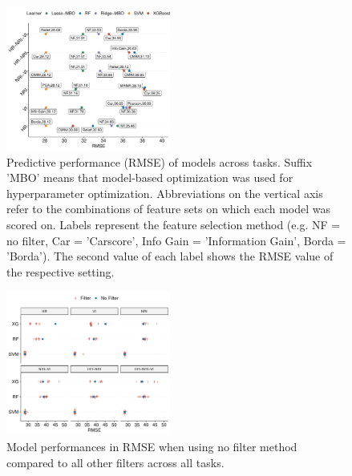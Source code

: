 \documentclass[peerreview]{IEEEtran}
\begin{document}










\begin{figure} [t!]
	\centering
	\begin{center}
		\includegraphics[width=0.48\textwidth] {performance-results-1.pdf}
		\caption{Predictive performance (RMSE) of models across tasks. Suffix 'MBO' means that model-based optimization was used for hyperparameter optimization. Abbreviations on the vertical axis refer to the combinations of feature sets on which each model was scored on. Labels represent the feature selection method (e.g. NF = no filter, Car = 'Carscore', Info Gain = 'Information Gain', Borda = 'Borda'). The second value of each label shows the RMSE value of the respective setting.}\label{fig:perf-result}
	\end{center}
\end{figure}

\begin{figure} [t!]
	\centering
	\begin{center}
		\includegraphics[width=0.48\textwidth] {filter-effect-all-vs-no-filter-1.pdf}
		\caption{Model performances in RMSE when using no filter method compared to all other filters across all tasks.}\label{fig:filter-effects-no-filter}
	\end{center}
\end{figure}
\end{document}

